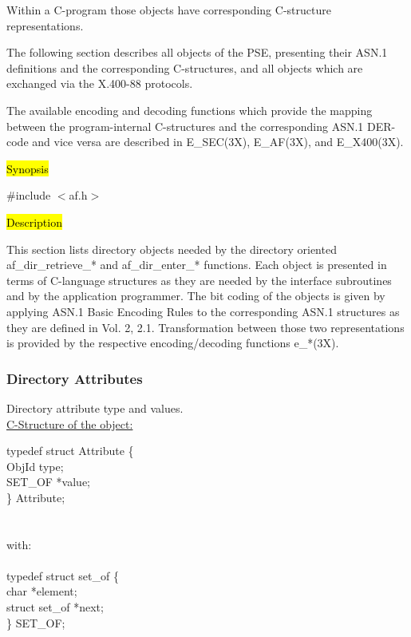 Within a C-program those objects have corresponding C-structure 
representations.

The following section describes all objects of the PSE, presenting their 
ASN.1 definitions
and the corresponding C-structures, and all objects which are exchanged via 
the X.400-88
protocols.

The available encoding and decoding functions which provide the mapping 
between the 
program-internal C-structures and the corresponding ASN.1 DER-code and vice 
versa are described
in E\_SEC(3X), E\_AF(3X), and E\_X400(3X).

\label{af-dirobj}

\hl{Synopsis}

\#include $<$af.h$>$

\hl{Description}
     
This section lists directory objects needed by the
directory oriented af\_dir\_retrieve\_* and af\_dir\_enter\_* functions.
Each object is presented in terms of C-language structures
as they are needed by the interface subroutines and
by the application programmer.
The bit coding of the objects is given by applying
ASN.1 Basic Encoding Rules to the corresponding ASN.1 structures as they
are defined in Vol. 2, 2.1. Transformation between those two representations
is provided by the respective encoding/decoding functions e\_*(3X).

\subsubsection{Directory Attributes}
Directory attribute type and values. \\
\underline{C-Structure of the object:}

{\small
\btab
\1      typedef struct Attribute \{ \\
\2              ObjId \2   type; \\
\2              SET\_OF \2      *value; \\
\1       \} Attribute; \\ \\ \\
with:   \\ \\
\1      typedef struct set\_of \{ \\
\2              char  \2          *element; \\
\2              struct set\_of \2 *next; \\
\1      \} SET\_OF; \\
\etab
}

